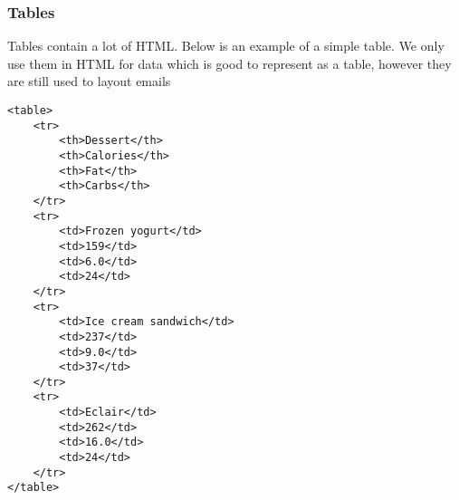 \subsubsection{Tables}

Tables contain a lot of HTML. Below is an example of a simple table. We only use them in HTML for data which is good to represent as a table, however they are still used to layout emails

\begin{verbatim}
<table>
	<tr>
		<th>Dessert</th>
		<th>Calories</th>
		<th>Fat</th>
		<th>Carbs</th>
	</tr>
	<tr>
		<td>Frozen yogurt</td>
		<td>159</td>
		<td>6.0</td>
		<td>24</td>
	</tr>
	<tr>
		<td>Ice cream sandwich</td>
		<td>237</td>
		<td>9.0</td>
		<td>37</td>
	</tr>
	<tr>
		<td>Eclair</td>
		<td>262</td>
		<td>16.0</td>
		<td>24</td>
	</tr>
</table>
\end{verbatim}
